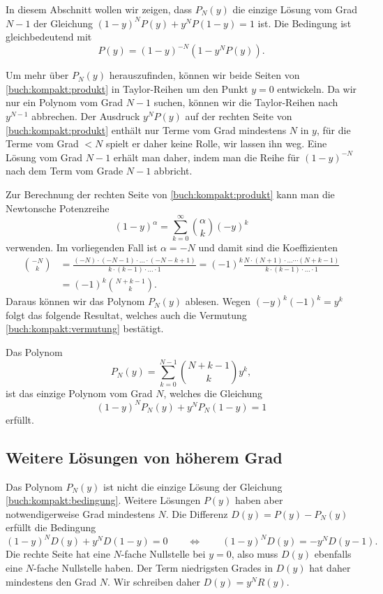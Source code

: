 In diesem Abschnitt wollen wir zeigen, dass $P_N(y)$ die einzige Lösung vom
Grad $N-1$ der Gleichung
$
(1-y)^NP(y)+y^NP(1-y)=1
$
ist.
Die Bedingung ist gleichbedeutend mit
\begin{equation}
P(y) = (1-y)^{-N} (1-y^NP(y)).
\label{buch:kompakt:produkt}
\end{equation}

Um mehr über $P_N(y)$ herauszufinden, können wir beide Seiten von
\eqref{buch:kompakt:produkt} in Taylor-Reihen um den Punkt $y=0$
entwickeln.
Da wir nur ein Polynom vom Grad $N-1$ suchen, können wir die Taylor-Reihen
nach $y^{N-1}$ abbrechen.
Der Ausdruck $y^NP(y)$ auf der rechten Seite von \eqref{buch:kompakt:produkt}
enthält nur Terme vom Grad mindestens $N$ in $y$,
für die Terme vom Grad $<N$ spielt er daher keine Rolle, wir lassen ihn weg.
Eine Lösung vom Grad $N-1$ erhält man daher, indem man die Reihe
für $(1-y)^{-N}$ nach dem Term vom Grade $N-1$ abbricht.

Zur Berechnung der rechten Seite von \eqref{buch:kompakt:produkt}
kann man die Newtonsche Potenzreihe
%
%
\begin{equation*}
(1-y)^{\alpha} = \sum_{k=0}^{\infty} \binom{\alpha}{k} (-y)^k
\end{equation*}
verwenden.
Im vorliegenden Fall ist $\alpha=-N$ und damit sind die Koeffizienten
\begin{align*}
\binom{-N}{k}
&=
\frac{(-N)\cdot(-N-1)\cdot\dots\cdot (-N-k+1)}{k\cdot (k-1)\cdot\dots\cdot 1}
=
(-1)^k \frac{N\cdot(N+1)\cdot\dots\cdots (N+k-1)}{k\cdot(k-1)\cdot\dots\cdot 1}
\\
&=
(-1)^k \binom{N+k-1}{k}.
\end{align*}
Daraus können wir das Polynom $P_N(y)$ ablesen.
Wegen $(-y)^k(-1)^k=y^k$ folgt das folgende Resultat,
welches auch die Vermutung \eqref{buch:kompakt:vermutung} bestätigt.

\begin{konsequenz}
\label{buch:kompakt:lemma-partial}
Das Polynom
\begin{equation}
P_N(y) = \sum_{k=0}^{N-1} \binom{N+k-1}{k}y^k,
\end{equation}
ist das einzige Polynom vom Grad $N$, welches die Gleichung
\[
(1-y)^NP_N(y) + y^NP_N(1-y)=1
\]
erfüllt.
\end{konsequenz}

\subsection{Weitere Lösungen von höherem Grad
\label{subsection:weitere loesungen}}
Das Polynom $P_N(y)$ ist nicht die einzige Lösung der Gleichung
\eqref{buch:kompakt:bedingung}.
Weitere Lösungen $P(y)$ haben aber notwendigerweise Grad mindestens $N$.
Die Differenz $D(y) = P(y)-P_N(y)$ erfüllt die Bedingung
\[
(1-y)^N D(y) + y^N D(1-y) = 0
\qquad\Leftrightarrow\qquad
(1-y)^N D(y) = -y^N D(y-1).
\]
Die rechte Seite hat eine $N$-fache Nullstelle bei $y=0$, also muss
$D(y)$ ebenfalls eine $N$-fache Nullstelle haben. 
Der Term niedrigsten Grades in $D(y)$ hat daher mindestens den Grad $N$.
Wir schreiben daher $D(y) = y^NR(y)$.

